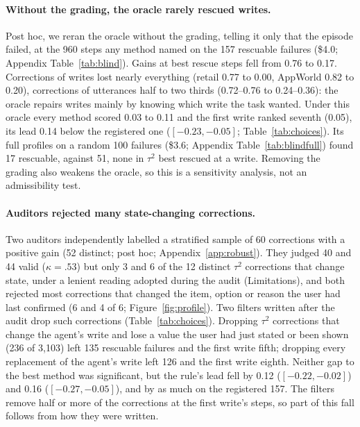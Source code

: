 \documentclass[11pt]{article}
\begin{document}
\paragraph{Without the grading, the oracle rarely rescued writes.} Post hoc, we reran the oracle without the grading, telling it only that the episode failed, at the 960 steps any method named on the 157 rescuable failures (\$4.0; Appendix Table~\ref{tab:blind}). Gains at best rescue steps fell from 0.76 to 0.17. Corrections of writes lost nearly everything (retail 0.77 to 0.00, AppWorld 0.82 to 0.20), corrections of utterances half to two thirds (0.72--0.76 to 0.24--0.36): the oracle repairs writes mainly by knowing which write the task wanted. Under this oracle every method scored 0.03 to 0.11 and the first write ranked seventh (0.05), its lead 0.14 below the registered one ($[-0.23,-0.05]$; Table~\ref{tab:choices}). Its full profiles on a random 100 failures (\$3.6; Appendix Table~\ref{tab:blindfull}) found 17 rescuable, against 51, none in $\tau^2$ best rescued at a write. Removing the grading also weakens the oracle, so this is a sensitivity analysis, not an admissibility test.

\paragraph{Auditors rejected many state-changing corrections.} Two auditors independently labelled a stratified sample of 60 corrections with a positive gain (52 distinct; post hoc; Appendix~\ref{app:robust}). They judged 40 and 44 valid ($\kappa=.53$) but only 3 and 6 of the 12 distinct $\tau^2$ corrections that change state, under a lenient reading adopted during the audit (Limitations), and both rejected most corrections that changed the item, option or reason the user had last confirmed (6 and 4 of 6; Figure~\ref{fig:profile}). Two filters written after the audit drop such corrections (Table~\ref{tab:choices}). Dropping $\tau^2$ corrections that change the agent's write and lose a value the user had just stated or been shown (236 of 3{,}103) left 135 rescuable failures and the first write fifth; dropping every replacement of the agent's write left 126 and the first write eighth. Neither gap to the best method was significant, but the rule's lead fell by 0.12 ($[-0.22,-0.02]$) and 0.16 ($[-0.27,-0.05]$), and by as much on the registered 157. The filters remove half or more of the corrections at the first write's steps, so part of this fall follows from how they were written.
\end{document}
